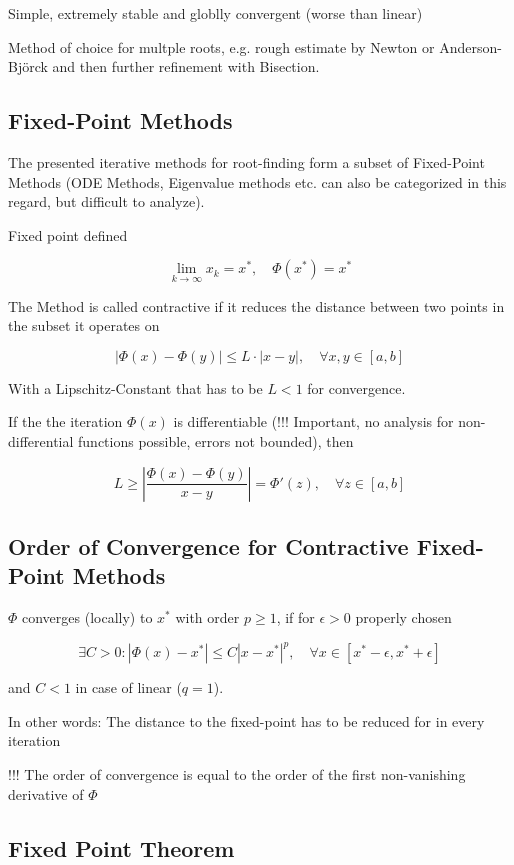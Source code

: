 \documentclass[
    a4paper,
    11pt
]{article}
\begin{document}
Simple, extremely stable and globlly convergent (worse than linear)

Method of choice for multple roots, e.g. rough estimate by Newton or
Anderson-Björck and then further refinement with Bisection.

\subsection{Fixed-Point Methods}

The presented iterative methods for root-finding form a subset of Fixed-Point
Methods (ODE Methods, Eigenvalue methods etc. can also be categorized in this
regard, but difficult to analyze).

Fixed point defined

\begin{equation}
    \lim_{k \to \infty} x_k = x^*, \quad \Phi(x^*) = x^*
\end{equation}

The Method is called contractive if it reduces the distance between two points
in the subset it operates on

\begin{equation}
    |\Phi(x) - \Phi(y) | \leq L \cdot | x - y |, \quad \forall x, y \in [a, b]
\end{equation}

With a Lipschitz-Constant that has to be $L<1$ for convergence.

If the the iteration $\Phi(x)$ is differentiable (!!! Important, no analysis for
non-differential functions possible, errors not bounded), then

\begin{equation}
    L \geq \left| \frac{\Phi(x) - \Phi(y)}{x - y} \right| = \Phi'(z), \quad
    \forall z \in [a,b]
\end{equation}

\subsection{Order of Convergence for Contractive Fixed-Point Methods}

$\Phi$ converges (locally) to $x^*$ with order $p \geq 1 $, if for $\epsilon > 0
$ properly chosen

\begin{equation}
    \exists C > 0 : |\Phi(x) - x^*| \leq C |x - x^*|^p, \quad \forall x \in [x^*
    - \epsilon, x^* + \epsilon]
\end{equation}

and $C < 1$ in case of linear ($q = 1$).

In other words: The distance to the fixed-point has to be reduced for in every
iteration

!!! The order of convergence is equal to the order of the first non-vanishing
derivative of $\Phi$

\subsection{Fixed Point Theorem}
\end{document}
